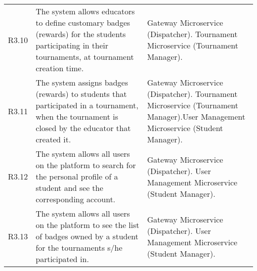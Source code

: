\begin{longtable}{p{1cm} p{5.5cm} p{6cm}}
 	R3.10 & The system allows educators to define customary badges (rewards) for the students participating in their tournaments, at tournament creation time. & Gateway Microservice (Dispatcher). \newline Tournament Microservice (Tournament Manager).\\
 	
 	R3.11 & The system assigns badges (rewards) to students that participated in a tournament, when the tournament is closed by the educator that created it. & Gateway Microservice (Dispatcher). \newline Tournament Microservice (Tournament Manager).\newline User Management Microservice (Student Manager).\\

	R3.12 & The system allows all users on the platform to search for the personal profile of a student and see the corresponding account. &  Gateway Microservice (Dispatcher). \newline  User Management Microservice (Student Manager).\\
	
	R3.13 & The system allows all users on the platform to see the list of badges owned by a student	for the tournaments s/he participated in. & Gateway Microservice (Dispatcher). \newline  User Management Microservice (Student Manager).\\
 	
\end{longtable}
